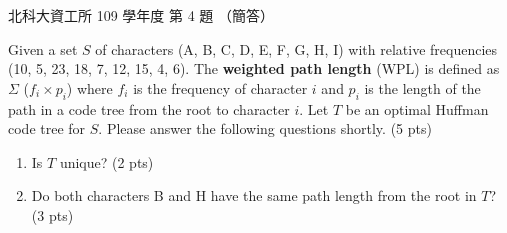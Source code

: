 \begin{pastexam}[label={px:ntut-109-ci-05}]{北科大資工所 109 學年度 第 4 題}
（簡答）

Given a set $S$ of characters (A, B, C, D, E, F, G, H, I) with relative frequencies (10, 5, 23, 18,
7, 12, 15, 4, 6). The \textbf{weighted path length} (WPL) is defined as $\Sigma$ ($f_i\times p_i$)
where $f_i$ is the frequency of character $i$ and $p_i$ is the length of the path in a code tree
from the root to character $i$. Let $T$ be an optimal Huffman code tree for $S$. Please answer the
following questions shortly. (5 pts)
\begin{enumerate}[label=(\arabic*)]
\item Is $T$ unique? (2 pts)
\item Do both characters B and H have the same path length from the root in $T$? (3 pts)
\end{enumerate}
\end{pastexam}


